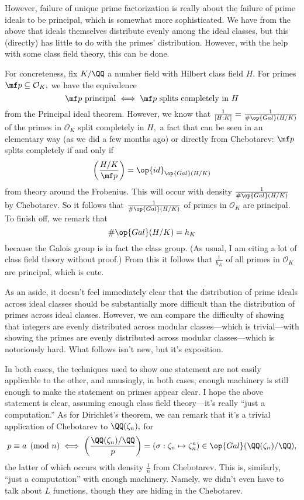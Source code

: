 However, failure of unique prime factorization is really about the failure of prime ideals to be principal, which is somewhat more sophisticated. We have from the above that ideals themselves distribute evenly among the ideal classes, but this (directly) has little to do with the primes' distribution. However, with the help with some class field theory, this can be done.

For concreteness, fix $K/\QQ$ a number field with Hilbert class field $H.$ For primes $\mf p\subseteq\mathcal O_K,$ we have the equivalence
\[\mf p\text{ principal}\iff\mf p\text{ splits completely in }H\]
from the Principal ideal theorem. However, we know that $\frac1{[H:K]}=\frac1{\#\op{Gal}(H/K)}$ of the primes in $\mathcal O_K$ split completely in $H,$ a fact that can be seen in an elementary way (as we did a few months ago) or directly from Chebotarev: $\mf p$ splits completely if and only if
\[\left(\frac{H/K}{\mf p}\right)=\op{id}_{\op{Gal}(H/K)}\]
from theory around the Frobenius. This will occur with density $\frac1{\#\op{Gal}(H/K)}$ by Chebotarev. So it follows that $\frac1{\#\op{Gal}(H/K)}$ of primes in $\mathcal O_K$ are principal. To finish off, we remark that
\[\#\op{Gal}(H/K)=h_K\]
because the Galois group is in fact the class group. (As usual, I am citing a lot of class field theory without proof.) From this it follows that $\frac1{h_K}$ of all primes in $\mathcal O_K$ are principal, which is cute.

As an aside, it doesn't feel immediately clear that the distribution of prime ideals across ideal classes should be substantially more difficult than the distribution of primes across ideal classes. However, we can compare the difficulty of showing that integers are evenly distributed across modular classes---which is trivial---with showing the primes are evenly distributed across modular classes---which is notoriously hard. What follows isn't new, but it's exposition.

In both cases, the techniques used to show one statement are not easily applicable to the other, and amusingly, in both cases, enough machinery is still enough to make the statement on primes appear clear. I hope the above statement is clear, assuming enough class field theory---it's really ``just a computation.'' As for Dirichlet's theorem, we can remark that it's a trivial application of Chebotarev to $\QQ(\zeta_n),$ for
\[p\equiv a\pmod n\iff\left(\frac{\QQ(\zeta_n)/\QQ}p\right)=\left(\sigma:\zeta_n\mapsto\zeta_n^a\right)\in\op{Gal}(\QQ(\zeta_n)/\QQ),\]
the latter of which occurs with density $\frac1n$ from Chebotarev. This is, similarly, ``just a computation'' with enough machinery. Namely, we didn't even have to talk about $L$ functions, though they are hiding in the Chebotarev.
